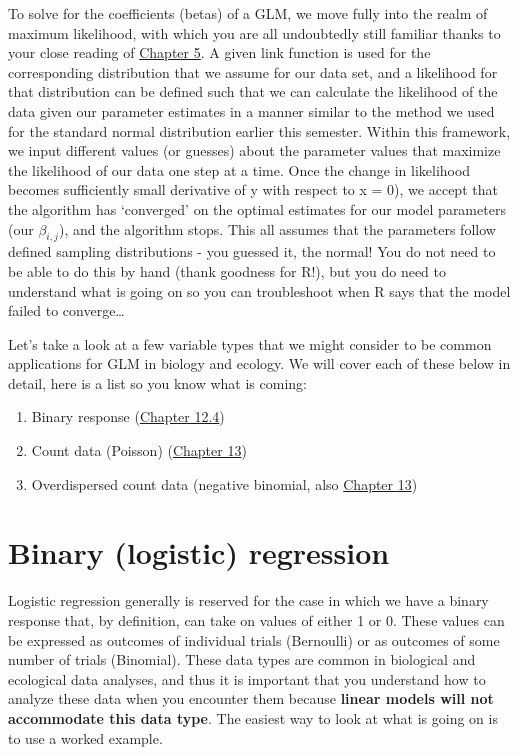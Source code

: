 \documentclass[
]{book}
\begin{document}
To solve for the coefficients (betas) of a GLM, we move fully into the realm of maximum likelihood, with which you are all undoubtedly still familiar thanks to your close reading of \protect\hyperlink{Chapter5}{Chapter 5}. A given link function is used for the corresponding distribution that we assume for our data set, and a likelihood for that distribution can be defined such that we can calculate the likelihood of the data given our parameter estimates in a manner similar to the method we used for the standard normal distribution earlier this semester. Within this framework, we input different values (or guesses) about the parameter values that maximize the likelihood of our data one step at a time. Once the change in likelihood becomes sufficiently small derivative of y with respect to x = 0), we accept that the algorithm has `converged' on the optimal estimates for our model parameters (our \(\beta_{i,j}\)), and the algorithm stops. This all assumes that the parameters follow defined sampling distributions - you guessed it, the normal! You do not need to be able to do this by hand (thank goodness for R!), but you do need to understand what is going on so you can troubleshoot when R says that the model failed to converge\ldots{}

Let's take a look at a few variable types that we might consider to be common applications for GLM in biology and ecology. We will cover each of these below in detail, here is a list so you know what is coming:

\begin{enumerate}
\def\labelenumi{\arabic{enumi}.}
\item
  Binary response (\protect\hyperlink{logistic}{Chapter 12.4})
\item
  Count data (Poisson) (\protect\hyperlink{Chapter13}{Chapter 13})
\item
  Overdispersed count data (negative binomial, also \protect\hyperlink{Chapter13}{Chapter 13})
\end{enumerate}

\hypertarget{logistic}{%
\section{Binary (logistic) regression}\label{logistic}}

Logistic regression generally is reserved for the case in which we have a binary response that, by definition, can take on values of either 1 or 0. These values can be expressed as outcomes of individual trials (Bernoulli) or as outcomes of some number of trials (Binomial). These data types are common in biological and ecological data analyses, and thus it is important that you understand how to analyze these data when you encounter them because \textbf{linear models will not accommodate this data type}. The easiest way to look at what is going on is to use a worked example.
\end{document}
